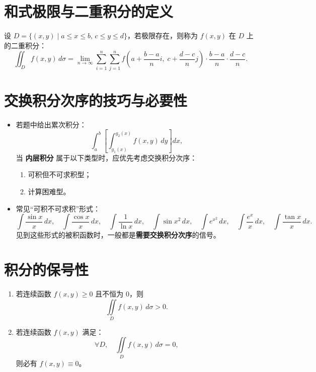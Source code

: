 
\section{和式极限与二重积分的定义}

设 $D = \{(x, y) \mid a \le x \le b,\, c \le y \le d\}$，若极限存在，则称为 $f(x,y)$ 在 $D$ 上的二重积分：
\[
    \iint_{D} f(x, y) \, d\sigma
    = \lim_{n \to \infty} \sum_{i=1}^{n} \sum_{j=1}^{n}
    f\!\left(a + \frac{b-a}{n}i,\; c + \frac{d-c}{n}j\right)
    \cdot \frac{b-a}{n} \cdot \frac{d-c}{n}.
\]

\section{交换积分次序的技巧与必要性}

\begin{itemize}
    \item 若题中给出累次积分：
          \[
              \int_{a}^{b} \left[\int_{g_1(x)}^{g_2(x)} f(x,y)\,dy\right] dx,
          \]
          当 \textbf{内层积分} 属于以下类型时，应优先考虑交换积分次序：
          \begin{enumerate}
              \item 可积但不可求积型；
              \item 计算困难型。
          \end{enumerate}

    \item 常见“可积不可求积”形式：
          \[
              \int \frac{\sin x}{x}\,dx, \quad
              \int \frac{\cos x}{x}\,dx, \quad
              \int \frac{1}{\ln x}\,dx, \quad
              \int \sin x^2\,dx, \quad
              \int e^{x^2}\,dx, \quad
              \int \frac{e^x}{x}\,dx, \quad
              \int \frac{\tan x}{x}\,dx.
          \]
          见到这些形式的被积函数时，一般都是\textbf{需要交换积分次序}的信号。
\end{itemize}

\section{积分的保号性}

\begin{enumerate}
    \item 若连续函数 $f(x,y) \ge 0$ 且不恒为 $0$，则
          \[
              \iint\limits_D f(x,y)\, d\sigma > 0.
          \]
    \item 若连续函数 $f(x,y)$ 满足：
          \[
              \forall D, \quad \iint\limits_D f(x,y)\, d\sigma = 0,
          \]
          则必有 $f(x,y) \equiv 0$。
\end{enumerate}

